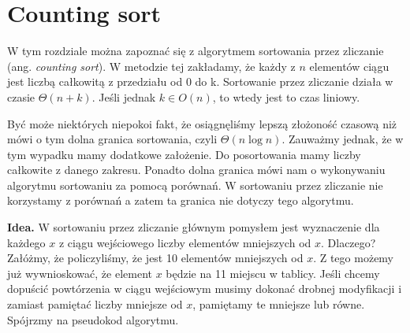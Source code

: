 \section{Counting sort}

\label{sec:countingsort}

W tym rozdziale można zapoznać się z algorytmem sortowania przez zliczanie (ang. \textit{counting sort}). 
W metodzie tej zakładamy, że każdy z $n$ elementów ciągu jest liczbą całkowitą z przedziału od 0 do k.
Sortowanie przez zliczanie działa w czasie $\Theta(n+k)$.
Jeśli jednak $k \in O(n)$, to wtedy jest to czas liniowy.

Być może niektórych niepokoi fakt, że osiągnęliśmy lepszą złożoność czasową niż mówi o tym dolna granica sortowania, czyli $\Theta(n \log n)$.
Zauważmy jednak, że w tym wypadku mamy dodatkowe założenie.
Do posortowania mamy liczby całkowite z danego zakresu.
Ponadto dolna granica mówi nam o wykonywaniu algorytmu sortowaniu za pomocą porównań.
W sortowaniu przez zliczanie nie korzystamy z porównań a zatem ta granica nie dotyczy tego algorytmu.

\textbf{Idea.} W sortowaniu przez zliczanie głównym pomysłem jest wyznaczenie dla każdego $x$ z ciągu wejściowego liczby elementów mniejszych od $x$.
Dlaczego?
Załóżmy, że policzyliśmy, że jest 10 elementów mniejszych od $x$.
Z tego możemy już wywnioskować, że element $x$ będzie na 11 miejscu w tablicy.
Jeśli chcemy dopuścić powtórzenia w ciągu wejściowym musimy dokonać drobnej modyfikacji i zamiast pamiętać liczby mniejsze od $x$, pamiętamy te mniejsze lub równe.
Spójrzmy na pseudokod algorytmu.

